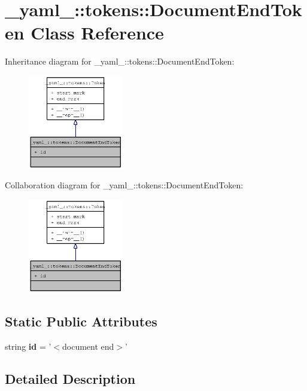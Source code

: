 \section{\_\-yaml\_\-::tokens::DocumentEndToken Class Reference}
\label{class__yaml___1_1tokens_1_1DocumentEndToken}
Inheritance diagram for \_\-yaml\_\-::tokens::DocumentEndToken:\nopagebreak
\begin{figure}[H]
\begin{center}
\leavevmode
\includegraphics[width=117pt]{class__yaml___1_1tokens_1_1DocumentEndToken__inherit__graph}
\end{center}
\end{figure}
Collaboration diagram for \_\-yaml\_\-::tokens::DocumentEndToken:\nopagebreak
\begin{figure}[H]
\begin{center}
\leavevmode
\includegraphics[width=117pt]{class__yaml___1_1tokens_1_1DocumentEndToken__coll__graph}
\end{center}
\end{figure}
\subsection*{Static Public Attributes}
\begin{CompactItemize}
\item 
string {\bf id} = '$<$document end$>$'
\end{CompactItemize}


\subsection{Detailed Description}


